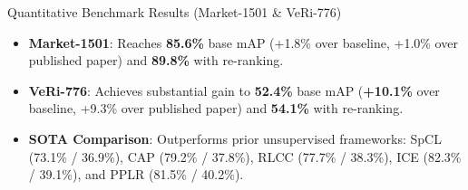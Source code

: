 \documentclass[aspectratio=169,xcolor=dvipsnames]{beamer}
\begin{document}
\begin{frame}{Quantitative Benchmark Results (Market-1501 \& VeRi-776)}
\vspace{-0.3em}
\begin{table}[h]
\centering
{}
\end{table}

\vspace{-0.2em}
\footnotesize
\begin{itemize}
    \setlength{\itemsep}{0.18em}
    \item \textbf{Market-1501}: Reaches \textbf{85.6\%} base mAP (+1.8\% over baseline, +1.0\% over published paper) and \textbf{89.8\%} with re-ranking.
    \item \textbf{VeRi-776}: Achieves substantial gain to \textbf{52.4\%} base mAP (\textbf{+10.1\%} over baseline, +9.3\% over published paper) and \textbf{54.1\%} with re-ranking.
    \item \textbf{SOTA Comparison}: Outperforms prior unsupervised frameworks: SpCL (73.1\% / 36.9\%), CAP (79.2\% / 37.8\%), RLCC (77.7\% / 38.3\%), ICE (82.3\% / 39.1\%), and PPLR (81.5\% / 40.2\%).
\end{itemize}
\end{frame}
\end{document}
